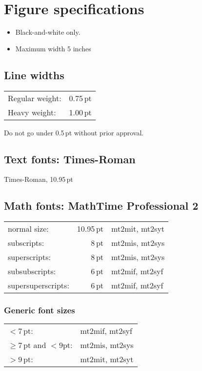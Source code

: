 \documentclass{article}
\begin{document}
\section{Figure specifications}

\begin{itemize}

\item Black-and-white only.

\item Maximum width 5 inches

\end{itemize}

\subsection{Line widths}

\begin{tabular}{@{}lr@{}}
Regular weight: & 0.75\,pt \\
Heavy weight:   & 1.00\,pt\rlap{ (?)}
\end{tabular}

\bigskip

\noindent
Do not go under 0.5\,pt without prior approval.

\subsection{Text fonts: Times-Roman}

Times-Roman, 10.95\,pt

\subsection{Math fonts: MathTime Professional 2}

\begin{tabular}{@{}lrl@{}}
normal size:        & 10.95\,pt & mt2mit, mt2syt \\
subscripts:         &     8\,pt & mt2mis, mt2sys \\
superscripts:       &     8\,pt & mt2mis, mt2sys \\
subsubscripts:      &     6\,pt & mt2mif, mt2syf \\
supersuperscripts:  &     6\,pt & mt2mif, mt2syf
\end{tabular}

\subsubsection{Generic font sizes}

\begin{tabular}{@{}ll@{}}
${} <   7\,\mathrm{pt}$:                         & mt2mif, mt2syf \\
${} \ge 7\,\mathrm{pt}$ and ${} < 9\mathrm{pt}$: & mt2mis, mt2sys \\
${} >   9\,\mathrm{pt}$:                         & mt2mit, mt2syt
\end{tabular}
\end{document}
